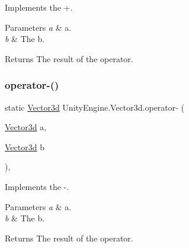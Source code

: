 Implements the +. 


\begin{DoxyParams}{Parameters}
{\em a} & a.\\
\hline
{\em b} & The b.\\
\hline
\end{DoxyParams}
\begin{DoxyReturn}{Returns}
The result of the operator.
\end{DoxyReturn}
\mbox{\label{struct_unity_engine_1_1_vector3d_aba72953258f8018bcc9add86691626d4}} 
\subsubsection{\texorpdfstring{operator-\/()}{operator-()}\hspace{0.1cm}{\footnotesize\ttfamily [1/2]}}
{\footnotesize\ttfamily static \hyperlink{struct_unity_engine_1_1_vector3d}{Vector3d} Unity\+Engine.\+Vector3d.\+operator-\/ (\begin{DoxyParamCaption}\item[{\hyperlink{struct_unity_engine_1_1_vector3d}{Vector3d}}]{a,  }\item[{\hyperlink{struct_unity_engine_1_1_vector3d}{Vector3d}}]{b }\end{DoxyParamCaption})\hspace{0.3cm}{\ttfamily [inline]}, {\ttfamily [static]}}



Implements the -\/. 


\begin{DoxyParams}{Parameters}
{\em a} & a.\\
\hline
{\em b} & The b.\\
\hline
\end{DoxyParams}
\begin{DoxyReturn}{Returns}
The result of the operator.
\end{DoxyReturn}
\mbox{\label{struct_unity_engine_1_1_vector3d_acad45715104521282736f9b6e46f9065}} 
